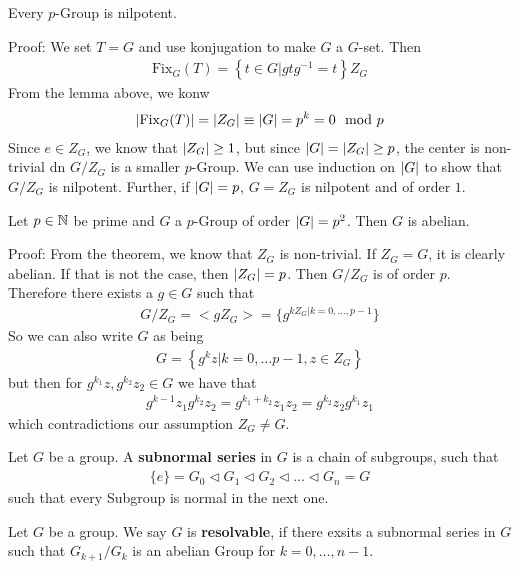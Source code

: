 \begin{theorem}[]
Every $p$-Group is nilpotent.
\end{theorem}
Proof: We set $T = G$ and use konjugation to make $G$ a $G$-set. Then
\begin{align*}
	\text{Fix}_G(T) = \left\{t \in G \big\vert gtg^{-1} = t\right\}Z_G
\end{align*}
From the lemma above, we konw
\begin{align*}
	\vert\text{Fix}_G(T)\vert = \vert Z_G\vert \equiv \vert G\vert = p^{k} = 0 \mod p
\end{align*}
Since $e \in Z_G$, we know that $\vert Z_G\vert \geq 1$, but since $\vert G\vert = \vert Z_G\vert \geq p$, the center is non-trivial dn $G/Z_G$ is a smaller $p$-Group. We can use induction on $\vert G\vert$ to show that $G/Z_G$ is nilpotent.
Further, if $\vert G\vert = p$, $G = Z_G$ is nilpotent and of order $1$. 


\begin{corollary}[]
Let $p \in \mathbb{N}$ be prime and $G$ a $p$-Group of order $\vert G\vert = p^{2}$. Then $G$ is abelian.
\end{corollary}
Proof: From the theorem, we know that $Z_G$ is non-trivial. If $Z_G = G$, it is clearly abelian. If that is not the case, then $\vert Z_G\vert = p$. Then $G/Z_G$ is of order $p$. Therefore there exists a $g \in G$ such that
\begin{align*}
	G/Z_G = <gZ_G> = \{g^{k Z_G \big\vert k = 0, \ldots, p-1}\}
\end{align*}
So we can also write $G$ as being
\begin{align*}
	G = \left\{g^{k}z \big\vert k = 0, \ldots p-1, z \in Z_G\right\}
\end{align*}
but then for $g^{k_1}z,g^{k_2}z_2 \in G$ we have that
\begin{align*}
	g^{k-1}z_1g^{k_2}z_2 = g^{k_1+k_2}z_1z_2 = g^{k_2}z_2g^{k_1}z_1
\end{align*}
which contradictions our assumption $Z_G \neq G$.


\begin{definition}[]
	Let $G$ be a group. A \textbf{subnormal series} in $G$ is a chain of subgroups, such that
	\begin{align*}
		\{e\} = G_0 \lhd G_1 \lhd G_2 \lhd \ldots \lhd G_n = G
	\end{align*}
	such that every Subgroup is normal in the next one.
\end{definition}

\begin{definition}[]
Let $G$ be a group. We say $G$ is \textbf{resolvable}, if there exsits a subnormal series in $G$ such that $G_{k+1}/G_k$ is an abelian Group for $k = 0, \ldots, n-1$.
\end{definition}

